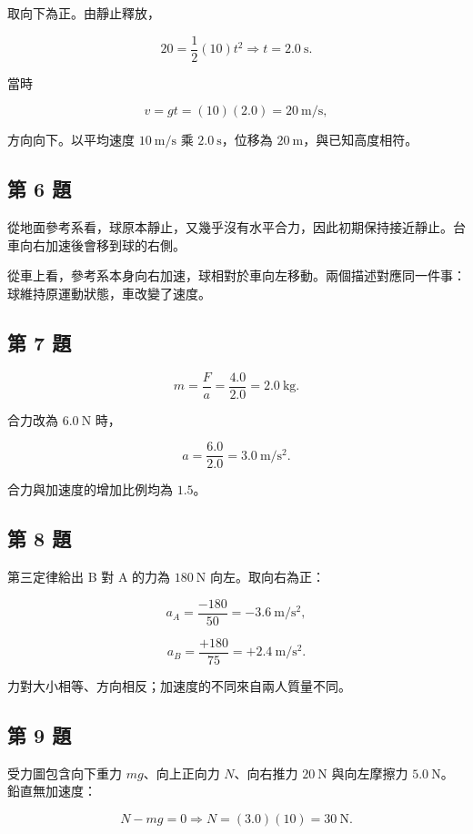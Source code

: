 \documentclass[11pt,a4paper]{article}
\begin{document}
取向下為正。由靜止釋放，

\[
20=\frac{1}{2}(10)t^2
\Rightarrow t=2.0\ \mathrm s.
\]

當時

\[
v=gt=(10)(2.0)=20\ \mathrm{m/s},
\]

方向向下。以平均速度 \(10\ \mathrm{m/s}\) 乘 \(2.0\ \mathrm s\)，位移為 \(20\ \mathrm m\)，與已知高度相符。

\subsection{第 6 題}\label{ux7b2c-6-ux984c}

從地面參考系看，球原本靜止，又幾乎沒有水平合力，因此初期保持接近靜止。台車向右加速後會移到球的右側。

從車上看，參考系本身向右加速，球相對於車向左移動。兩個描述對應同一件事：球維持原運動狀態，車改變了速度。

\subsection{第 7 題}\label{ux7b2c-7-ux984c}

\[
m=\frac{F}{a}=\frac{4.0}{2.0}=2.0\ \mathrm{kg}.
\]

合力改為 \(6.0\ \mathrm N\) 時，

\[
a=\frac{6.0}{2.0}=3.0\ \mathrm{m/s^2}.
\]

合力與加速度的增加比例均為 \(1.5\)。

\subsection{第 8 題}\label{ux7b2c-8-ux984c}

第三定律給出 B 對 A 的力為 \(180\ \mathrm N\) 向左。取向右為正：

\[
a_A=\frac{-180}{50}=-3.6\ \mathrm{m/s^2},
\]

\[
a_B=\frac{+180}{75}=+2.4\ \mathrm{m/s^2}.
\]

力對大小相等、方向相反；加速度的不同來自兩人質量不同。

\subsection{第 9 題}\label{ux7b2c-9-ux984c}

受力圖包含向下重力 \(mg\)、向上正向力 \(N\)、向右推力 \(20\ \mathrm N\) 與向左摩擦力 \(5.0\ \mathrm N\)。鉛直無加速度：

\[
N-mg=0\Rightarrow N=(3.0)(10)=30\ \mathrm N.
\]
\end{document}
